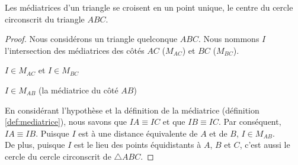 \documentclass[a4paper,12pt]{article}
\begin{document}
\begin{corollary} \label{cor:mediatrices}
Les médiatrices d'un triangle se croisent en un point unique, le centre du cercle circonscrit du triangle $ABC$.
\end{corollary}
\begin{proof}
Nous considérons un triangle quelconque $ABC$. Nous nommons $I$ l'intersection des médiatrices des côtés $AC$ ($M_{AC}$) et $BC$ ($M_{BC}$).

\begin{hyp}
$I \in M_{AC}$ et $I \in M_{BC}$
\end{hyp}
\begin{concl}
$I \in M_{AB}$ (la médiatrice du côté $AB$) 
\end{concl}

En considérant l'hypothèse et la définition de la médiatrice (définition \ref{def:mediatrice}), nous savons que $IA \equiv IC$ et que $IB \equiv IC$. Par conséquent, $IA \equiv IB$. Puisque $I$ est à une distance équivalente de $A$ et de $B$, $I \in M_{AB}$.\\
De plus, puisque $I$ est le lieu des points équidistants à $A$, $B$ et $C$, c'est aussi le cercle du cercle circonscrit de $\triangle ABC$.
\end{proof}
\end{document}
